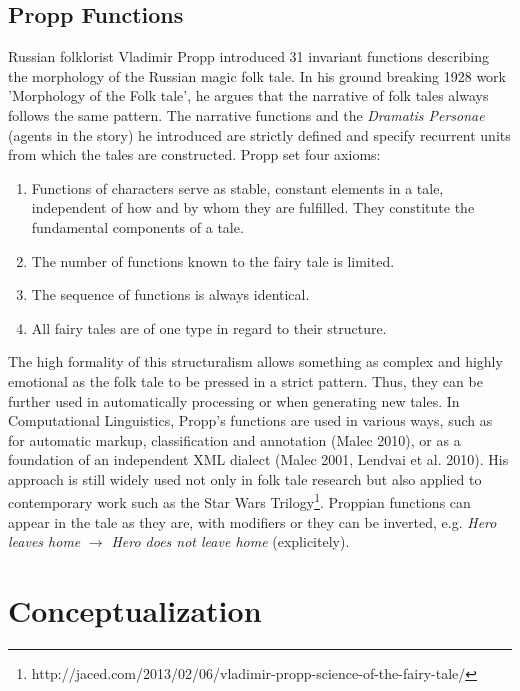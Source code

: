 \documentclass[10pt,a4paper]{article}
\begin{document}
	\subsection{Propp Functions} 
	Russian folklorist Vladimir Propp introduced 31 invariant functions describing the morphology of the Russian magic folk tale. In his ground breaking 1928 work 'Morphology of the Folk tale', he argues that the narrative of folk tales always follows the same pattern. The narrative functions and the \textit{Dramatis Personae} (agents in the story) he introduced are strictly defined and specify recurrent units from which the tales are constructed. 
	Propp \cite{propp1968} set four axioms: 
	
	\begin{enumerate}
	
		\item Functions of characters serve as stable, constant elements in a tale, independent of how and by whom they are fulfilled. They constitute the fundamental components of a tale.
		\item The number of functions known to the fairy tale is limited.
		\item The sequence of functions is always identical.
		\item All fairy tales are of one type in regard to their structure.   
	
	\end{enumerate}
	
The high formality of this structuralism allows something as complex and highly emotional as the folk tale to be pressed in a strict pattern. Thus, they can be further used in automatically processing or when generating new tales. In Computational Linguistics, Propp's functions are used in various ways, such as for automatic markup, classification and annotation (Malec 2010), or as a foundation of an independent XML dialect (Malec 2001,  Lendvai et al. 2010). 
	His approach is still widely used not only in folk tale research but also applied to contemporary work such as the Star Wars Trilogy\footnote{http://jaced.com/2013/02/06/vladimir-propp-science-of-the-fairy-tale/}.  Proppian functions can appear in the tale as they are, with modifiers or they can be inverted, e.g. \textit{Hero leaves home} $\rightarrow$ \textit{Hero does not leave home} (explicitely).

\section{Conceptualization}
\end{document}
